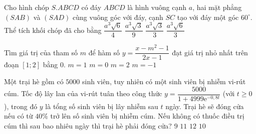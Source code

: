 \begin{ex}%
Cho hình chóp $S.ABCD$ có đáy $ABCD$ là hình vuông cạnh $a$, hai mặt phẳng $(SAB)$ và $(SAD)$ cùng vuông góc với đáy, cạnh $SC$ tạo với đáy một góc $60^{\circ}$. Thể tích khối chóp đã cho bằng
\choice
{$\dfrac{a^{3}\sqrt{6}}{4}$}
{$\dfrac{a^{3}\sqrt{3}}{9}$}
{$\dfrac{a^{3}\sqrt{3}}{3}$}
{\True $\dfrac{a^{3}\sqrt{6}}{3}$}
\end{ex}
\begin{ex}%
Tìm giá trị của tham số $m$ để hàm số $y=\dfrac{x-m^{2}-1}{2x-1}$ đạt giá trị nhỏ nhất trên đoạn $[1;2]$ bằng $0$.
\choice
{$m=1$}
{\True $m=0$}
{$m=2$}
{$m=-1$}
\end{ex}
\begin{ex}%
Một trại hè gồm có $5000$ sinh viên, tuy nhiên có một sinh viên bị nhiễm vi-rút cúm. Tốc độ lây lan của vi-rút tuân theo công thức $y=\dfrac{5000}{1+4999\mathrm{e}^{-0,8t}}$ (với $t\geq 0$), trong đó $y$ là tổng số sinh viên bị lây nhiễm sau $t$ ngày. Trại hè sẽ đóng cửa nếu có từ $40\%$ trở lên số sinh viên bị nhiễm cúm. Nếu không có thuốc điều trị cúm thì sau bao nhiêu ngày thì trại hè phải đóng cửa?
\choice
{$9$}
{\True $11$}
{$12$}
{$10$}
\end{ex}
